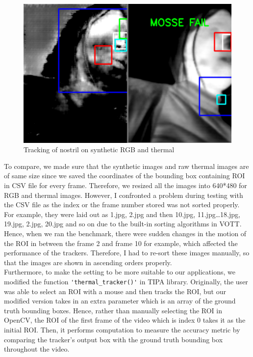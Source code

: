 \documentclass[conference]{IEEEtran}
\begin{document}
\begin{figure}[htbp]
\centerline{\includegraphics[scale = 0.25]{nostril.png}}
\caption{Tracking of nostril on synthetic RGB and thermal}
\label{fig}
\end{figure}

To compare, we made sure that the synthetic images and raw thermal images are of same size since we saved the coordinates of the bounding box containing ROI in CSV file for every frame. Therefore, we resized all the images into 640*480 for RGB and thermal images. However, I confronted a problem during testing with the CSV file as the index or the frame number stored was not sorted properly. For example, they were laid out as 1.jpg, 2.jpg and then 10.jpg, 11.jpg…18.jpg, 19.jpg, 2.jpg, 20.jpg and so on due to the built-in sorting algorithms in VOTT. Hence, when we ran the benchmark, there were sudden changes in the motion of the ROI in between the frame 2 and frame 10 for example, which affected the performance of the trackers. Therefore, I had to re-sort these images manually, so that the images are shown in ascending orders properly. \\

Furthermore, to make the setting to be more suitable to our applications, we modified the function \verb|'thermal_tracker()'| in TIPA library\cite{b7}. Originally, the user was able to select an ROI with a mouse and then tracks the ROI, but our modified version takes in an extra parameter which is an array of the ground truth bounding boxes. Hence, rather than manually selecting the ROI in OpenCV, the ROI of the first frame of the video which is index 0 takes it as the initial ROI. Then, it performs computation to measure the accuracy metric by comparing the tracker’s output box with the ground truth bounding box throughout the video.\\
\end{document}
